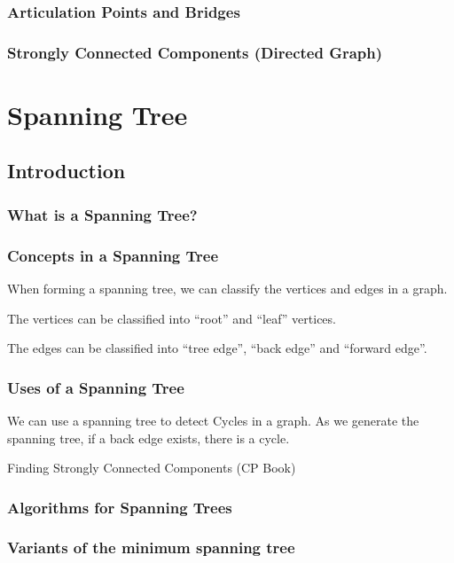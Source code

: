 \documentclass{beamer}
\begin{document}
\begin{frame}
  \frametitle{Articulation Points and Bridges}

\end{frame}

\begin{frame}
  \frametitle{Strongly Connected Components (Directed Graph)}
\end{frame}

\section{Spanning Tree}
\subsection{Introduction}
\begin{frame}
  \frametitle{What is a Spanning Tree?}
\end{frame}

\begin{frame}
  \frametitle{Concepts in a Spanning Tree} 

  When forming a spanning tree, we can classify the vertices and edges
  in a graph.

  The vertices can be classified into ``root'' and ``leaf'' vertices.

  The edges can be classified into ``tree edge'', ``back edge'' and ``forward edge''.
\end{frame}

\begin{frame}
  \frametitle{Uses of a Spanning Tree}
  We can use a spanning tree to detect Cycles in a graph. As we generate 
  the spanning tree, if a back edge exists, there is a cycle.

  Finding Strongly Connected Components (CP Book)
\end{frame}

\begin{frame}
  \frametitle{Algorithms for Spanning Trees}
\end{frame}

\begin{frame}
  \frametitle{Variants of the minimum spanning tree}
\end{frame}


\end{document}
